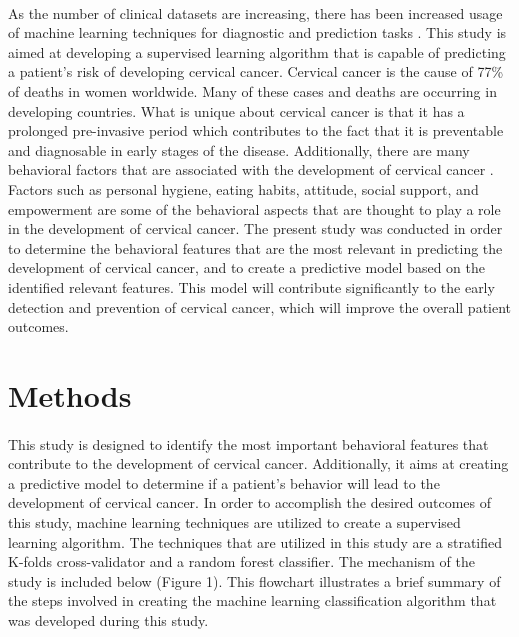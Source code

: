 \documentclass[10pt, oneside, twocolumn]{article}
\begin{document}
\paragraph{}
As the number of clinical datasets are increasing, there has been increased usage of machine learning techniques for diagnostic and prediction tasks \cite{Wiens}. This study is aimed at developing a supervised learning algorithm that is capable of predicting a patient’s risk of developing cervical cancer. Cervical cancer is the cause of 77\% of deaths in women worldwide. Many of these cases and deaths are occurring in developing countries. What is unique about cervical cancer is that it has a prolonged pre-invasive period which contributes to the fact that it is preventable and diagnosable in early stages of the disease. Additionally, there are many behavioral factors that are associated with the development of cervical cancer \cite{AFCC}. Factors such as personal hygiene, eating habits, attitude, social support, and empowerment are some of the behavioral aspects that are thought to play a role in the development of cervical cancer. The present study was conducted in order to determine the behavioral features that are the most relevant in predicting the development of cervical cancer, and to create a predictive model based on the identified relevant features. This model will contribute significantly to the early detection and prevention of cervical cancer, which will improve the overall patient outcomes. 

\section{Methods}
\paragraph{}
This study is designed to identify the most important behavioral features that contribute to the development of cervical cancer. Additionally, it aims at creating a predictive model to determine if a patient’s behavior will lead to the development of cervical cancer. In order to accomplish the desired outcomes of this study, machine learning techniques are utilized to create a supervised learning algorithm. The techniques that  are utilized in this study are a stratified K-folds cross-validator and a random forest classifier. The mechanism of the study is included below (Figure 1). This flowchart illustrates a brief summary of the steps involved in creating the machine learning classification algorithm that was developed during this study.
\end{document}
